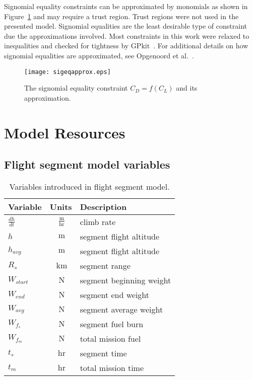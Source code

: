Signomial equality constraints can be approximated by monomials as shown in
Figure~\ref{f:sigeq} and may require a trust region. Trust regions were not
used in the presented model. Signomial equalities are the least desirable type
of constraint due the approximations involved. Most constraints in this work
were relaxed to inequalities and checked for tightness by GPkit~\cite{gpkit}. For
additional details on how signomial equalities are approximated, see Opgenoord
et al.~\cite{sigeqpaper}.

\begin{figure}[!ht]
\centering
\texttt{[image: sigeqapprox.eps]}
\caption{The signomial equality constraint $C_{D} = f(C_{L})$ and its
approximation.}\label{f:sigeq}
\end{figure}

\chapter{Model Resources}

\section{Flight segment model variables}
\label{a:flightprofilevars}

\begin{footnotesize}
    \begin{table}[H]
        \centering
        \begin{tabular}{l c l}
            \toprule
            Variable & Units & Description \\
            \midrule
            $\frac{dh}{dt}$  & $~\mathrm{\tfrac{m}{hr}}$ & climb rate \\
            $h$ & $~\mathrm{m}$ & segment flight altitude\\
            $h_{avg}$ & $~\mathrm{m}$ & segment flight altitude\\
            $R_s$ & $~\mathrm{km}$ & segment range\\
            $W_{start}$  & $~\mathrm{N}$ & segment beginning weight\\
            $W_{end}$ & $~\mathrm{N}$ & segment end weight\\
            $W_{avg}$ & $~\mathrm{N}$ & segment average weight\\
            $W_{f_s}$ & $~\mathrm{N}$ & segment fuel burn\\
            $W_{f_m}$  & $~\mathrm{N}$ & total mission fuel\\
            $t_s$ & $~\mathrm{hr}$ & segment time\\
            $t_m$  & $~\mathrm{hr}$ & total mission time\\
            \bottomrule
        \end{tabular}
        \caption{Variables introduced in flight segment model.}
        \label{t:vars_flightprofile}
    \end{table}
\end{footnotesize}
